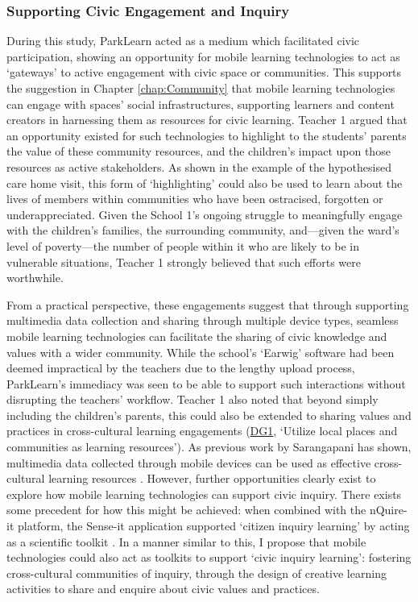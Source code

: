\subsubsection{Supporting Civic Engagement and Inquiry}

During this study, ParkLearn acted as a medium which facilitated civic participation, showing an opportunity for mobile learning technologies to act as `gateways' to active engagement with civic space or communities. This supports the suggestion in Chapter \ref{chap:Community} that mobile learning technologies can engage with spaces’ social infrastructures, supporting learners and content creators in harnessing them as resources for civic learning. Teacher 1 argued that an opportunity existed for such technologies to highlight to the students' parents the value of these community resources, and the children’s impact upon those resources as active stakeholders. As shown in the example of the hypothesised care home visit, this form of `highlighting' could also be used to learn about the lives of members within communities who have been ostracised, forgotten or underappreciated. Given the School 1's ongoing struggle to meaningfully engage with the children's families, the surrounding community, and---given the ward's level of poverty---the number of people within it who are likely to be in vulnerable situations, Teacher 1 strongly believed that such efforts were worthwhile.

From a practical perspective, these engagements suggest that through supporting multimedia data collection and sharing through multiple device types, seamless mobile learning technologies can facilitate the sharing of civic knowledge and values with a wider community. While the school's ‘Earwig’ software had been deemed impractical by the teachers due to the lengthy upload process, ParkLearn’s immediacy was seen to be able to support such interactions without disrupting the teachers’ workflow. Teacher 1 also noted that beyond simply including the children’s parents, this could also be extended to sharing values and practices in cross-cultural learning engagements (\hyperref[DG1]{DG1}, `Utilize local places and communities as learning resources'). As previous work by Sarangapani has shown, multimedia data collected through mobile devices can be used as effective cross-cultural learning resources \citep{Sarangapani2016}. However, further opportunities clearly exist to explore how mobile learning technologies can support civic inquiry. There exists some precedent for how this might be achieved: when combined with the nQuire-it platform, the Sense-it application supported ‘citizen inquiry learning’ by acting as a scientific toolkit \citep{Sharples2017}. In a manner similar to this, I propose that mobile technologies could also act as toolkits to support ‘civic inquiry learning’: fostering cross-cultural communities of inquiry, through the design of creative learning activities to share and enquire about civic values and practices.

